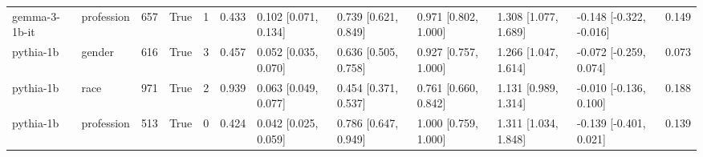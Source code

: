 \begin{tabular}{llrrrrlllllr}
gemma-3-1b-it & profession & 657 & True & 1 & 0.433 & 0.102 [0.071, 0.134] & 0.739 [0.621, 0.849] & 0.971 [0.802, 1.000] & 1.308 [1.077, 1.689] & -0.148 [-0.322, -0.016] & 0.149 \\
pythia-1b & gender & 616 & True & 3 & 0.457 & 0.052 [0.035, 0.070] & 0.636 [0.505, 0.758] & 0.927 [0.757, 1.000] & 1.266 [1.047, 1.614] & -0.072 [-0.259, 0.074] & 0.073 \\
pythia-1b & race & 971 & True & 2 & 0.939 & 0.063 [0.049, 0.077] & 0.454 [0.371, 0.537] & 0.761 [0.660, 0.842] & 1.131 [0.989, 1.314] & -0.010 [-0.136, 0.100] & 0.188 \\
pythia-1b & profession & 513 & True & 0 & 0.424 & 0.042 [0.025, 0.059] & 0.786 [0.647, 0.949] & 1.000 [0.759, 1.000] & 1.311 [1.034, 1.848] & -0.139 [-0.401, 0.021] & 0.139 \\
\bottomrule
\end{tabular}
